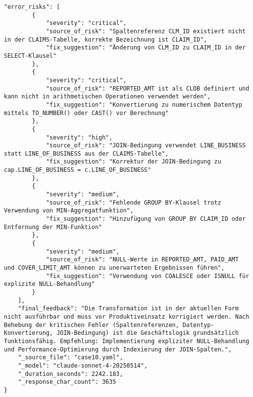 \begin{lstlisting}[caption={Ausgabe: Claude Sonnet 4 Anwendungsfall 10 Robustheitsdurchlauf},label={claude_case10_prompt3}]
    "error_risks": [
        {
            "severity": "critical",
            "source_of_risk": "Spaltenreferenz CLM_ID existiert nicht in der CLAIMS-Tabelle, korrekte Bezeichnung ist CLAIM_ID",
            "fix_suggestion": "Änderung von CLM_ID zu CLAIM_ID in der SELECT-Klausel"
        },
        {
            "severity": "critical",
            "source_of_risk": "REPORTED_AMT ist als CLOB definiert und kann nicht in arithmetischen Operationen verwendet werden",
            "fix_suggestion": "Konvertierung zu numerischem Datentyp mittels TO_NUMBER() oder CAST() vor Berechnung"
        },
        {
            "severity": "high",
            "source_of_risk": "JOIN-Bedingung verwendet LINE_BUSINESS statt LINE_OF_BUSINESS aus der CLAIMS-Tabelle",
            "fix_suggestion": "Korrektur der JOIN-Bedingung zu cap.LINE_OF_BUSINESS = c.LINE_OF_BUSINESS"
        },
        {
            "severity": "medium",
            "source_of_risk": "Fehlende GROUP BY-Klausel trotz Verwendung von MIN-Aggregatfunktion",
            "fix_suggestion": "Hinzufügung von GROUP BY CLAIM_ID oder Entfernung der MIN-Funktion"
        },
        {
            "severity": "medium",
            "source_of_risk": "NULL-Werte in REPORTED_AMT, PAID_AMT und COVER_LIMIT_AMT können zu unerwarteten Ergebnissen führen",
            "fix_suggestion": "Verwendung von COALESCE oder ISNULL für explizite NULL-Behandlung"
        }
    ],
    "final_feedback": "Die Transformation ist in der aktuellen Form nicht ausführbar und muss vor Produktiveinsatz korrigiert werden. Nach Behebung der kritischen Fehler (Spaltenreferenzen, Datentyp-Konvertierung, JOIN-Bedingung) ist die Geschäftslogik grundsätzlich funktionsfähig. Empfehlung: Implementierung expliziter NULL-Behandlung und Performance-Optimierung durch Indexierung der JOIN-Spalten.",
    "_source_file": "case10.yaml",
    "_model": "claude-sonnet-4-20250514",
    "_duration_seconds": 2242.183,
    "_response_char_count": 3635
}
\end{lstlisting}


